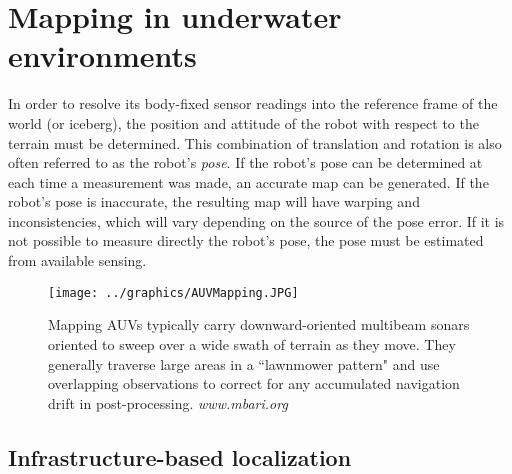
\section{Mapping in underwater environments}

In order to resolve its body-fixed sensor readings into the reference frame of the world (or iceberg), the position and attitude of the robot with respect to the terrain must be determined. This combination of translation and rotation is also often referred to as the robot's \emph{pose}. If the robot's pose can be determined at each time a measurement was made, an accurate map can be generated. If the robot's pose is inaccurate, the resulting map will have warping and inconsistencies, which will vary depending on the source of the pose error. If it is not possible to measure directly the robot's pose, the pose must be estimated from available sensing. 

\begin{figure}[htbp]
   \centering
   \texttt{[image: ../graphics/AUVMapping.JPG]} %
   \caption{Mapping AUVs typically carry downward-oriented multibeam sonars oriented to sweep over a wide swath of terrain as they move. They generally traverse large areas in a ``lawnmower pattern" and use overlapping observations to correct for any accumulated navigation drift in post-processing. \emph{www.mbari.org} }
   \label{fig:AUVbathyMapping}
\end{figure}

\subsection{Infrastructure-based localization}

